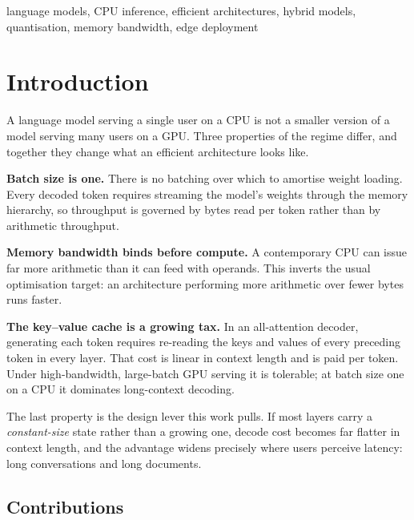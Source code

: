 \documentclass[conference]{IEEEtran}
\begin{document}
\begin{IEEEkeywords}
language models, CPU inference, efficient architectures, hybrid models,
quantisation, memory bandwidth, edge deployment
\end{IEEEkeywords}

\section{Introduction}

A language model serving a single user on a CPU is not a smaller version of a
model serving many users on a GPU. Three properties of the regime differ, and
together they change what an efficient architecture looks like.

\textbf{Batch size is one.} There is no batching over which to amortise weight
loading. Every decoded token requires streaming the model's weights through the
memory hierarchy, so throughput is governed by bytes read per token rather than
by arithmetic throughput.

\textbf{Memory bandwidth binds before compute.} A contemporary CPU can issue far
more arithmetic than it can feed with operands. This inverts the usual
optimisation target: an architecture performing more arithmetic over fewer bytes
runs faster.

\textbf{The key--value cache is a growing tax.} In an all-attention decoder,
generating each token requires re-reading the keys and values of every preceding
token in every layer. That cost is linear in context length and is paid per
token. Under high-bandwidth, large-batch GPU serving it is tolerable; at batch
size one on a CPU it dominates long-context decoding.

The last property is the design lever this work pulls. If most layers carry a
\emph{constant-size} state rather than a growing one, decode cost becomes far
flatter in context length, and the advantage widens precisely where users
perceive latency: long conversations and long documents.

\subsection{Contributions}
\end{document}
